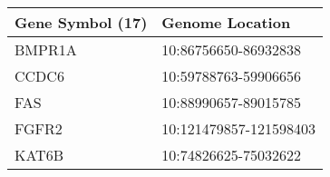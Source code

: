 \begin{tabular}{ll}
\toprule
Gene Symbol (17) &        Genome Location \\
\midrule
          BMPR1A &   10:86756650-86932838 \\
           CCDC6 &   10:59788763-59906656 \\
             FAS &   10:88990657-89015785 \\
           FGFR2 & 10:121479857-121598403 \\
           KAT6B &   10:74826625-75032622 \\
\bottomrule
\end{tabular}
